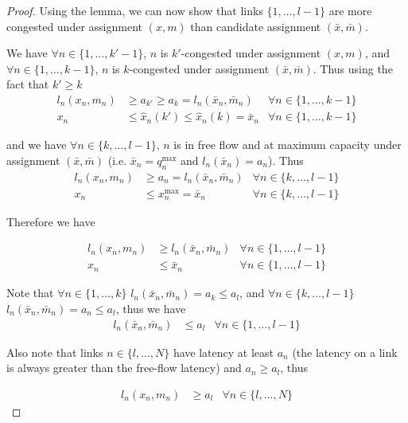 \begin{proof}
\bigskip
Using the lemma, we can now show that links $\{1, \dots, l-1\}$ are more congested under assignment $(x, m)$ than candidate assignment $(\bar{x}, \bar{m})$.

We have $\forall n \in \{1, \dots, k'-1\}$, $n$ is $k'$-congested under assignment $(x, m)$, and $\forall n \in \{1, \dots, k-1\}$, $n$ is $k$-congested under assignment $(\bar{x}, \bar{m})$. Thus using the fact that $k' \geq k$
\begin{align*}
l_n(x_n, m_n) &\geq a_{k'} \geq a_k = l_n(\bar{x}_n, \bar{m}_n) & \forall n \in \{1, \dots, k-1\}\\
x_n &\leq \hat{x}_n(k') \leq \hat{x}_n(k) = \bar{x}_n & \forall n \in \{1, \dots, k-1\}
\end{align*}

and we have $\forall n \in \{ k, \dots, l-1\}$, $n$ is in free flow and at maximum capacity under assignment $(\bar{x}, \bar{m})$ (i.e. $\bar{x}_n = q_n^{\max}$ and $l_n(\bar{x}_n) = a_n$). Thus
\begin{align*}
l_n(x_n, m_n) &\geq a_n = l_n(\bar{x}_n, \bar{m}_n) & \forall n \in \{ k, \dots, l-1\}\\
x_n &\leq x^{\max}_n = \bar{x}_n & \forall n \in \{ k, \dots, l-1\}
\end{align*}

Therefore we have

\begin{align}
\label{eq:cong_latency}
l_n(x_n, m_n) &\geq l_n(\bar{x}_n, \bar{m}_n) & \forall n \in \{ 1, \dots, l-1\}\\
\label{eq:cong_flow}
x_n &\leq \bar{x}_n &\forall n \in \{ 1, \dots, l-1\}
\end{align}

Note that $\forall n \in \{1, \dots, k\}$ $l_n(\bar{x}_n, \bar{m}_n) = a_k \leq a_l$, and $\forall n \in \{k, \dots, l-1\}$ $l_n(\bar{x}_n, \bar{m}_n) = a_n \leq a_l$, thus we have
\begin{align}
\label{eq:cong_latencybar}
l_n(\bar{x}_n, \bar{m}_n) &\leq a_l & \forall n \in \{ 1, \dots, l-1\}
\end{align}


Also note that links $n \in \{ l, \dots, N\}$ have latency at least $a_n$ (the latency on a link is always greater than the free-flow latency) and $a_n \geq a_l$, thus

\begin{align}
\label{eq:ff_latency}
l_n(x_n, m_n) & \geq a_l & \forall n \in \{ l, \dots, N\}
\end{align}



\end{proof}
